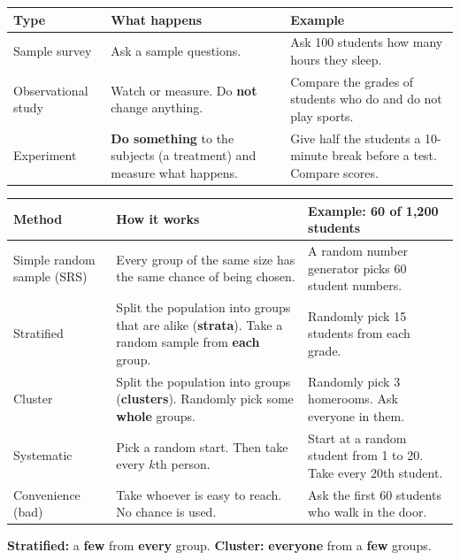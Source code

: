 \documentclass[11pt]{article}
\newcommand{\sumhead}[1]{\par\vspace{0.7em}{\large\bfseries #1}\par\vspace{0.3em}}
\newlength{\sumtw}
\newcommand{\sumtitle}[1]{\settowidth{\sumtw}{\Large\bfseries #1}%
  \ifdim\sumtw>4.3in \hfill Name \underline{\hspace{2in}}\par\vspace{0.5em}{\Large\bfseries #1}\par\vspace{0.6em}%
  \else {\Large\bfseries #1}\hfill Name \underline{\hspace{2in}}\par\vspace{0.6em}\fi}
\begin{document}
\sumtitle{Unit 5 Summary: Study Design}

\sumhead{Types of Studies}
\begin{tabular}{|L{1.4in}|L{2.5in}|L{2.55in}|}\hline
\textbf{Type} & \textbf{What happens} & \textbf{Example}\\ \hline
Sample survey & Ask a sample questions. & Ask 100 students how many hours they sleep.\\ \hline
Observational study & Watch or measure. Do \textbf{not} change anything. & Compare the grades of students who do and do not play sports.\\ \hline
Experiment & \textbf{Do something} to the subjects (a treatment) and measure what happens. & Give half the students a 10-minute break before a test. Compare scores.\\ \hline
\end{tabular}

\sumhead{Choosing a Sample}
\begin{tabular}{|L{1.4in}|L{2.5in}|L{2.55in}|}\hline
\textbf{Method} & \textbf{How it works} & \textbf{Example: 60 of 1,200 students}\\ \hline
Simple random sample (SRS) & Every group of the same size has the same chance of being chosen. & A random number generator picks 60 student numbers.\\ \hline
Stratified & Split the population into groups that are alike (\textbf{strata}). Take a random sample from \textbf{each} group. & Randomly pick 15 students from each grade.\\ \hline
Cluster & Split the population into groups (\textbf{clusters}). Randomly pick some \textbf{whole} groups. & Randomly pick 3 homerooms. Ask everyone in them.\\ \hline
Systematic & Pick a random start. Then take every $k$th person. & Start at a random student from 1 to 20. Take every 20th student.\\ \hline
Convenience (bad) & Take whoever is easy to reach. No chance is used. & Ask the first 60 students who walk in the door.\\ \hline
\end{tabular}

\vspace{0.3em}
\textbf{Stratified:} a \textbf{few} from \textbf{every} group. \quad \textbf{Cluster:} \textbf{everyone} from a \textbf{few} groups.
\end{document}
